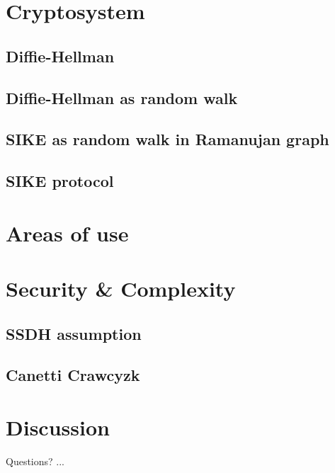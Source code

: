 \documentclass{beamer}
\begin{document}
\section{Cryptosystem}

\subsection{Diffie-Hellman}
\subsection{Diffie-Hellman as random walk}
\subsection{SIKE as random walk in Ramanujan graph}
\subsection{SIKE protocol}

\section{Areas of use}

\section{Security \& Complexity}
\subsection{SSDH assumption}
\subsection{Canetti Crawcyzk}

\section{Discussion}
\begin{frame}{Questions?}
...
\end{frame}
\end{document}
